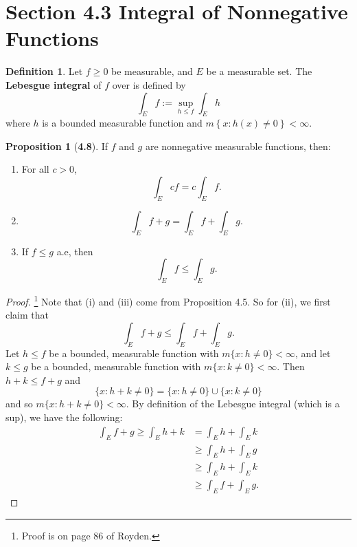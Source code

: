 \documentclass[12pt]{article}
\theoremstyle{definition}
\newtheorem*{definition}{Definition}
\newtheorem*{prop}{Proposition}
\begin{document}
\section*{Section 4.3 Integral of Nonnegative Functions}

\begin{definition}
  Let \( f \geq 0 \) be measurable, and \( E \) be a measurable set. The \textbf{Lebesgue integral} of \( f \) over is defined by 
    \[
        \int_{E} f := \sup_{h \leq f} \int_{E} h
    \]
  where \( h \) is a bounded measurable function and \( m\left\{ x: h(x) \neq 0 \right\} < \infty \).
  
\end{definition}

\begin{prop}[\textbf{4.8}]

  If \( f \) and \( g \) are nonnegative measurable functions, then:
    \begin{enumerate}[label = \roman{*}.]
      \item For all \( c > 0 \),
        \[
            \int_{E} cf = c \int_{E} f.
        \]
        \item \[ \int_{E} f + g = \int_{E} f + \int_{E} g. \]
        \item If \( f \leq g \) a.e, then 
          \[
              \int_{E} f \leq \int_{E} g.
          \]
    \end{enumerate}


    \begin{proof}\footnote{Proof is on page 86 of Royden.}  Note that (i) and (iii) come from Proposition 4.5. So for (ii), we first claim that 
      \[
        \int_{E} f + g \leq \int_{E} f + \int_{E} g.
      \]
    Let \( h \leq f \) be a bounded, measurable function with \( m \{ x: h \neq 0\} < \infty \), and let \( k \leq g \) be a bounded, measurable function with \( m \{ x: k \neq 0 \} < \infty \).  Then \( h +k \leq f + g \) and
      \[
         \{ x: h + k \neq 0 \} = \{ x: h \neq 0 \} \cup \{ x: k \neq 0 \}
      \]
    and so \( m \{x: h + k \neq 0 \} < \infty \). By definition of the Lebesgue integral (which is a sup), we have the following:
      \begin{align*}
        \int_{E} f + g \geq \int_{E} h + k &= \int_{E} h + \int_{E} k \\
        &\geq \int_{E} h + \int_{E} g \\
        &\geq \int_{E} h + \int_{E} k \\
        &\geq \int_{E} f + \int_{E} g.
      \end{align*}


\end{proof}
\end{prop}
\end{document}
